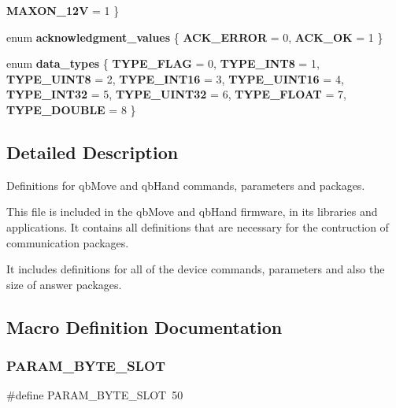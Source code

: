 \begin{DoxyCompactItemize}
{\bfseries M\+A\+X\+O\+N\+\_\+12V} = 1
 \}
\item 
\mbox{\label{commands_8h_a0eae1c82d20671c5d0b9b82b10070f1b}} 
enum {\bfseries acknowledgment\+\_\+values} \{ {\bfseries A\+C\+K\+\_\+\+E\+R\+R\+OR} = 0, 
{\bfseries A\+C\+K\+\_\+\+OK} = 1
 \}
\item 
\mbox{\label{commands_8h_aee7544e5fa6e2843ecdc3609602e56aa}} 
enum {\bfseries data\+\_\+types} \{ \newline
{\bfseries T\+Y\+P\+E\+\_\+\+F\+L\+AG} = 0, 
{\bfseries T\+Y\+P\+E\+\_\+\+I\+N\+T8} = 1, 
{\bfseries T\+Y\+P\+E\+\_\+\+U\+I\+N\+T8} = 2, 
{\bfseries T\+Y\+P\+E\+\_\+\+I\+N\+T16} = 3, 
\newline
{\bfseries T\+Y\+P\+E\+\_\+\+U\+I\+N\+T16} = 4, 
{\bfseries T\+Y\+P\+E\+\_\+\+I\+N\+T32} = 5, 
{\bfseries T\+Y\+P\+E\+\_\+\+U\+I\+N\+T32} = 6, 
{\bfseries T\+Y\+P\+E\+\_\+\+F\+L\+O\+AT} = 7, 
\newline
{\bfseries T\+Y\+P\+E\+\_\+\+D\+O\+U\+B\+LE} = 8
 \}
\end{DoxyCompactItemize}


\subsection{Detailed Description}
Definitions for qb\+Move and qb\+Hand commands, parameters and packages. 

This file is included in the qb\+Move and qb\+Hand firmware, in its libraries and applications. It contains all definitions that are necessary for the contruction of communication packages.

It includes definitions for all of the device commands, parameters and also the size of answer packages. 

\subsection{Macro Definition Documentation}
\mbox{\label{commands_8h_ae3302107827a773be3200e459e7b24da}} 
\subsubsection{P\+A\+R\+A\+M\+\_\+\+B\+Y\+T\+E\+\_\+\+S\+L\+OT}
{\footnotesize\ttfamily \#define P\+A\+R\+A\+M\+\_\+\+B\+Y\+T\+E\+\_\+\+S\+L\+OT~50}

